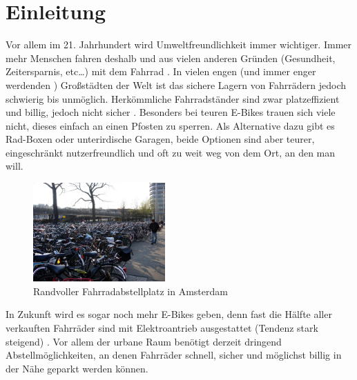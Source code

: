 \section{Einleitung}
Vor allem im 21. Jahrhundert wird Umweltfreundlichkeit immer wichtiger. Immer mehr Menschen fahren deshalb und aus vielen anderen Gründen (Gesundheit, Zeitersparnis, etc…) mit dem Fahrrad . In vielen engen (und immer enger werdenden ) Großstädten der Welt ist das sichere Lagern von Fahrrädern jedoch schwierig bis unmöglich. Herkömmliche Fahrradständer sind zwar platzeffizient und billig, jedoch nicht sicher . Besonders bei teuren E-Bikes trauen sich viele nicht, dieses einfach an einen Pfosten zu sperren. Als Alternative dazu gibt es Rad-Boxen oder unterirdische Garagen, beide Optionen sind aber teurer, eingeschränkt nutzerfreundlich und oft zu weit weg von dem Ort, an den man will.

\begin{figure}[H]
    \centering
    \includegraphics[width=0.45\textwidth]{images/fahrrad_parkhaus_voll}
    \caption{Randvoller Fahrradabstellplatz in Amsterdam }
    \label{fig:fahrrad_parkhaus_voll}
\end{figure}

In Zukunft wird es sogar noch mehr E-Bikes geben, denn fast die Hälfte aller verkauften Fahrräder sind mit Elektroantrieb ausgestattet (Tendenz stark steigend) . Vor allem der urbane Raum benötigt derzeit dringend Abstellmöglichkeiten, an denen Fahrräder schnell, sicher und möglichst billig in der Nähe geparkt werden können.

\clearpage


\clearpage



